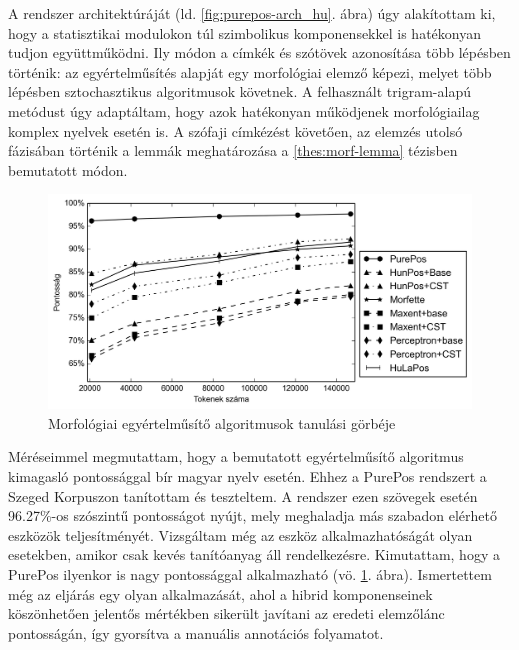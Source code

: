 A rendszer architektúráját  (ld. \ref{fig:purepos-arch_hu}. ábra) úgy alakítottam ki, hogy a statisztikai modulokon túl szimbolikus komponensekkel is hatékonyan tudjon együttműködni. 
Ily módon a címkék és szótövek azonosítása több lépésben történik:
az egyértelműsítés alapját egy morfológiai elemző képezi, melyet több lépésben sztochasztikus algoritmusok követnek. 
A felhasznált trigram-alapú metódust úgy adaptáltam, hogy azok hatékonyan működjenek morfológiailag komplex nyelvek esetén is.
A szófaji címkézést követően, az elemzés utolsó fázisában történik a lemmák meghatározása a \ref{thes:morf-lemma} tézisben bemutatott módon.

\begin{figure} %
  \centering
  \includegraphics[width=1\textwidth]{MorphTagging/humor_token_hu.png}
  \caption{Morfológiai egyértelműsítő algoritmusok tanulási görbéje}
  \label{fig:humor-token_hu}
\end{figure}

Méréseimmel megmutattam, hogy a bemutatott egyértelműsítő algoritmus kimagasló pontossággal bír magyar nyelv esetén. 
Ehhez a PurePos rendszert a Szeged Korpuszon tanítottam és teszteltem. 
A rendszer ezen szövegek esetén 96.27\%-os szószintű pontosságot nyújt, mely meghaladja más szabadon elérhető eszközök teljesítményét.
Vizsgáltam még az eszköz alkalmazhatóságát olyan esetekben, amikor csak kevés tanítóanyag áll rendelkezésre.
Kimutattam, hogy a PurePos ilyenkor is nagy pontossággal alkalmazható (vö. \ref{fig:humor-token_hu}. ábra). 
Ismertettem még az eljárás egy olyan alkalmazását, ahol a hibrid komponenseinek köszönhetően jelentős mértékben sikerült javítani az eredeti elemzőlánc pontosságán, így gyorsítva a manuális annotációs folyamatot.


